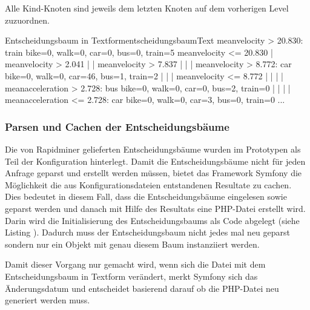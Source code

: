 Alle Kind-Knoten sind jeweils dem letzten Knoten auf dem vorherigen Level zuzuordnen.

\begin{code}[]{Entscheidungsbaum in Textform}{entscheidungsbaumText}
meanvelocity > 20.830: train {bike=0, walk=0, car=0, bus=0, train=5}
meanvelocity <= 20.830
|   meanvelocity > 2.041
|   |   meanvelocity > 7.837
|   |   |   meanvelocity > 8.772: car {bike=0, walk=0, car=46, bus=1, train=2}
|   |   |   meanvelocity <= 8.772
|   |   |   |   meanacceleration > 2.728: bus {bike=0, walk=0, car=0, bus=2, train=0}
|   |   |   |   meanacceleration <= 2.728: car {bike=0, walk=0, car=3, bus=0, train=0}
...
\end{code}

\subsubsection{Parsen und Cachen der Entscheidungsbäume}
Die von Rapidminer gelieferten Entscheidungsbäume wurden im Prototypen als Teil der Konfiguration hinterlegt. Damit die Entscheidungsbäume nicht für jeden Anfrage geparst und erstellt werden müssen, bietet das Framework Symfony die Möglichkeit die aus Konfigurationsdateien entstandenen Resultate zu cachen. Dies bedeutet in diesem Fall, dass die Entscheidungsbäume eingelesen sowie geparst werden und danach mit Hilfe des Resultats eine PHP-Datei erstellt wird. Darin wird die Initialisierung des Entscheidungsbaums als Code abgelegt (siehe Listing ). Dadurch muss der Entscheidungsbaum nicht jedes mal neu geparst sondern nur ein Objekt mit genau diesem Baum instanziiert werden. 

\begin{code}[PHP]{Ausschnitt des generierten Entscheidungsbaums als PHP-Klasse}{entscheidungsbaumPHP}
...
class BasicDecisionTree implements DecisionTreeInterface
{
    protected $tree;

    function __construct()
    {
        $node0 = new Node();
        $node0->setDecision(new Decision('meanvelocity', '>', 20.83));
        $node1 = new Node();
        $node1->setResult(new Result(0,0,0,0,5));
        ...
        $node0->setRight($node2);
        $node1->setParent($node1);
        $node2->setParent($node0);
        $node2->setLeft($node3);
        ...
\end{code}

Damit dieser Vorgang nur gemacht wird, wenn sich die Datei mit dem Entscheidungsbaum in Textform verändert, merkt Symfony sich das Änderungsdatum und entscheidet basierend darauf ob die PHP-Datei neu generiert werden muss.

